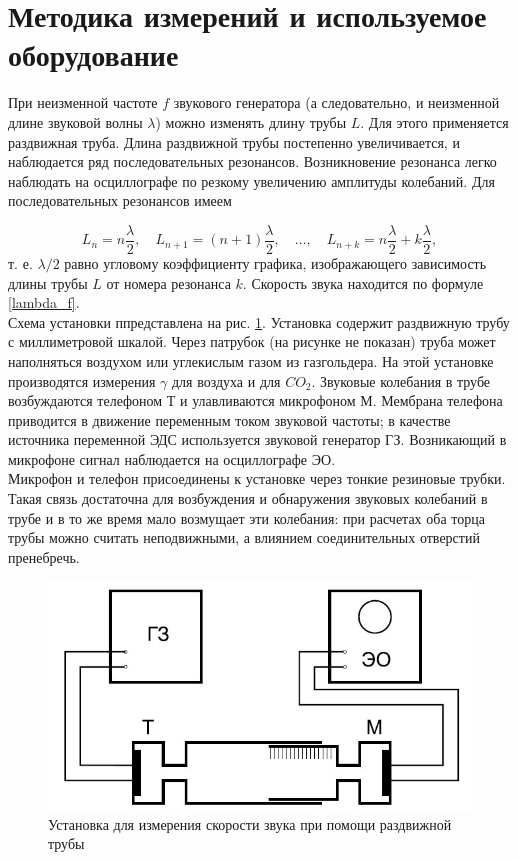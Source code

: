 \documentclass[a4paper, 12pt]{article}
\begin{document}
    \section*{Методика измерений и используемое оборудование}

         \noindent При неизменной частоте $f$ звукового генератора (а следовательно, и неизменной длине звуковой волны $\lambda$) можно изменять длину трубы $L$. Для этого применяется раздвижная труба. Длина раздвижной трубы постепенно увеличивается, и наблюдается ряд последовательных резонансов. Возникновение резонанса легко наблюдать на осциллографе по резкому увеличению амплитуды колебаний. Для последовательных резонансов имеем 
                
        \begin{equation}
            \label{first}
            L_n=n\frac{\lambda}{2}, \quad L_{n+1}=(n+1)\frac{\lambda}{2}, \quad \dots, \quad L_{n+k} = n\frac{\lambda}{2}+k\frac{\lambda}{2},
        \end{equation} 
        \noindent т. е. $\lambda/2$ равно угловому коэффициенту графика, изображающего зависимость длины трубы $L$ от номера резонанса $k$. Скорость звука находится по формуле \eqref{lambda_f}.\\
    
        \noindent Схема установки ппредставлена на рис. \ref{setup}. Установка содержит раздвижную трубу с миллиметровой шкалой. Через патрубок (на рисунке не показан) труба может наполняться воздухом или углекислым газом из газгольдера. На этой установке производятся измерения $\gamma$ для воздуха и для $CO_2$. Звуковые колебания в трубе возбуждаются телефоном Т и улавливаются микрофоном М. Мембрана телефона приводится в движение переменным током звуковой частоты; в качестве источника переменной ЭДС используется звуковой генератор ГЗ. Возникающий в микрофоне сигнал наблюдается на осциллографе ЭО.\\
    
       \noindent  Микрофон и телефон присоединены к установке через тонкие резиновые трубки. Такая связь достаточна для возбуждения и обнаружения звуковых колебаний в трубе и в то же время мало возмущает эти колебания: при расчетах оба торца трубы можно считать неподвижными, а влиянием соединительных отверстий пренебречь.
    
        \begin{figure}[H]
            \centering
            \includegraphics[width=12cm]{images/setup.jpg}
            \caption{Установка для измерения скорости звука при помощи раздвижной трубы}
            \label{setup}
        \end{figure}
    
\end{document}
